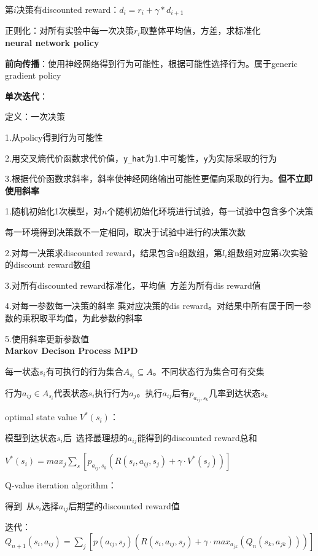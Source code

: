 \documentclass[UTF8]{ctexart}
\begin{document}
  \quad 第$i$决策有discounted reward：$d_i = r_i + \gamma * d_{i+1}$
  
  \quad 正则化：对所有实验中每一次决策$r_i$取整体平均值，方差，求标准化\\
\textbf{neural network policy}

  \textbf{前向传播}：使用神经网络得到行为可能性，根据可能性选择行为。属于generic gradient policy

  \textbf{单次迭代}：

  \quad 定义：一次决策

  \quad \quad 1.从policy得到行为可能性

  \quad \quad 2.用交叉熵代价函数求代价值，\texttt{y\_hat}为1.中可能性，\texttt{y}为实际采取的行为

  \quad \quad 3.根据代价函数求斜率，斜率使神经网络输出可能性更偏向采取的行为。\textbf{但不立即使用斜率}

  \quad 1.随机初始化1次模型，对$n$个随机初始化环境进行试验，每一试验中包含多个决策
  
  \quad \quad 每一环境得到决策数不一定相同，取决于试验中进行的决策次数

  \quad 2.对每一决策求discounted reward，结果包含n组数组，第$l_i$组数组对应第$i$次实验的discount reward数组

  \quad 3.对所有discounted reward标准化，平均值\ 方差为所有dis reward值
  
  \quad 4.对每一参数每一决策的斜率 乘对应决策的dis reward。对结果中所有属于同一参数的乘积取平均值，为此参数的斜率

  \quad 5.使用斜率更新参数值\\
\textbf{Markov Decison Process MPD}

  每一状态$s_i$有可执行的行为集合$A_{s_i} \subseteq A$。不同状态行为集合可有交集

  行为$a_{ij} \in A_{s_i}$代表状态$s_i$执行行为$a_j$。执行$a_{ij}$后有$p_{a_{ij}, s_k}$几率到达状态$s_k$

  optimal state value $V^*(s_i)$：
  
  \quad 模型到达状态$s_i$后\ 选择最理想的$a_{ij}$能得到的discounted reward总和

  \quad $V^*(s_i) = max_j \sum_s [p_{a_{ij}, s_k} (R(s_i, a_{ij}, s_j) + \gamma \cdot V^*(s_j))]$
  
  Q-value iteration algorithm：

  \quad 得到\ 从$s_i$选择$a_{ij}$后期望的discounted reward值

  \quad 迭代：$Q_{n+1}(s_i, a_{ij}) = \sum_j [p(a_{ij}, s_j) (R(s_i, a_{ij}, s_j) + \gamma \cdot max_{a_{jk}} (Q_n(s_k, a_{jk})))]$
  
\end{document}
